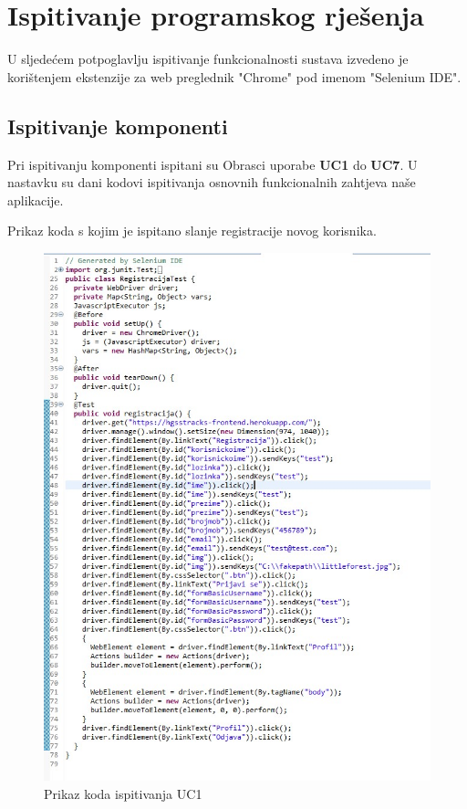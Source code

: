 			
			\eject 
		
	\newpage
		\section{Ispitivanje programskog rješenja}
			

			
			{U sljedećem potpoglavlju ispitivanje funkcionalnosti sustava izvedeno je korištenjem ekstenzije za web preglednik "Chrome" pod imenom "Selenium IDE".}
	
			
			\subsection{Ispitivanje komponenti}
			{Pri ispitivanju komponenti ispitani su Obrasci uporabe \textbf{UC1} do \textbf{UC7}. U nastavku su dani kodovi ispitivanja osnovnih funkcionalnih zahtjeva naše aplikacije.}
			
			\newpage
			\begin{packed_item}
				\item {Prikaz koda s kojim je ispitano slanje registracije novog korisnika.}\\
				
				\begin{figure}[h!]
					\centering
					\includegraphics[width=\linewidth]{./slike/TestRegistracije.jpg}
					\caption{Prikaz koda ispitivanja UC1}
				\end{figure}
				\eject
			\end{packed_item}
		
